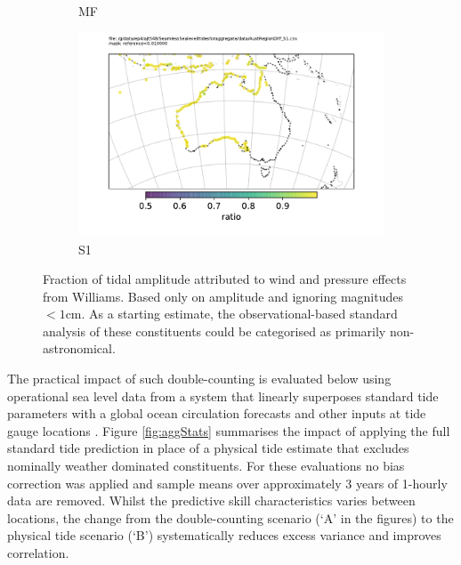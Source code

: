 \begin{figure}[h]
\begin{subfigure}[b]{\figwidthHalf}
        \caption{MF}
    \end{subfigure}
    \begin{subfigure}[b]{\figwidthHalf}
        \includegraphics[width=\textwidth]{figures/maps/AustRegionDiff_S1.pdf}
        \caption{S1}
    \end{subfigure}
    \caption{Fraction of tidal amplitude attributed to wind and pressure effects from Williams\citep{10.5194/os-2020-107}.  Based only on amplitude and ignoring magnitudes $<1$cm.  As a starting estimate, the observational-based standard analysis of these constituents could be categorised as primarily non-astronomical.}
    \label{fig:williamsFraction}
\end{figure}

The practical impact of such double-counting is evaluated below using operational sea level data from a system that linearly superposes standard tide parameters with a global ocean circulation forecasts and other inputs at tide gauge locations \citep{Taylor:2017coa}\citep{10.1080/1755876x.2019.1685834}.
Figure \ref{fig:aggStats} summarises the impact of applying the full standard tide prediction 
in place of a physical tide estimate that excludes nominally weather dominated constituents.
For these evaluations no bias correction was applied and sample means over approximately 3 years of 1-hourly data are removed.  Whilst the predictive skill characteristics varies between locations, the change from the double-counting scenario (`A' in the figures) to the physical tide scenario (`B') systematically reduces excess variance and improves correlation.


